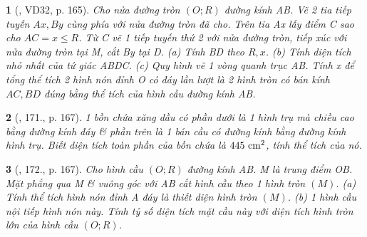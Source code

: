 \documentclass{article}
\newtheorem{baitoan}{}
\begin{document}
\begin{baitoan}[\cite{Tuyen_Toan_9_old}, VD32, p. 165]
	Cho nửa đường tròn $(O;R)$ đường kính AB. Vẽ 2 tia tiếp tuyến $Ax,By$ cùng phía với nửa đường tròn đã cho. Trên tia Ax lấy điểm C sao cho $AC = x\le R$. Từ C vẽ 1 tiếp tuyến thứ 2 với nửa đường tròn, tiếp xúc với nửa đường tròn tại M, cắt By tại D. (a) Tính BD theo $R,x$. (b) Tính diện tích nhỏ nhất của tứ giác ABDC. (c) Quy hình vẽ 1 vòng quanh trục AB. Tính x để tổng thể tích 2 hình nón đỉnh O có đáy lần lượt là 2 hình tròn có bán kính $AC,BD$ đúng bằng thể tích của hình cầu đường kính AB.
\end{baitoan}

\begin{baitoan}[\cite{Tuyen_Toan_9_old}, 171., p. 167]
	1 bồn chứa xăng dầu có phần dưới là 1 hình trụ mà chiều cao bằng đường kính đáy \& phần trên là 1 bán cầu có đường kính bằng đường kính hình trụ. Biết diện tích toàn phần của bồn chứa là $445\ {\rm cm}^2$, tính thể tích của nó.
\end{baitoan}

\begin{baitoan}[\cite{Tuyen_Toan_9_old}, 172., p. 167]
	Cho hình cầu $(O;R)$ đường kính AB. M là trung điểm OB. Mặt phẳng qua M \& vuông góc với AB cắt hình cầu theo 1 hình tròn $(M)$. (a) Tính thể tích hình nón đỉnh A đáy là thiết diện hình tròn $(M)$. (b) 1 hình cầu nội tiếp hình nón này. Tính tỷ số diện tích mặt cầu này với diện tích hình tròn lớn của hình cầu $(O;R)$.
\end{baitoan}


\printbibliography[heading=bibintoc]
	
\end{document}
